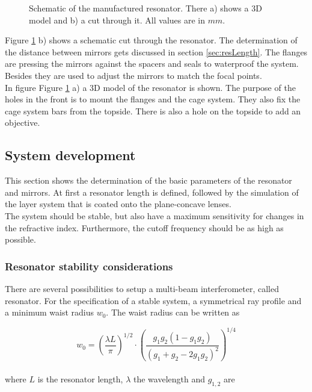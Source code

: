 \begin{figure}[H]
	\caption{Schematic of the manufactured resonator. There a) shows a 3D model and b) a cut through it. All values are in $mm$.}
	\label{fig:resSchematic}
\end{figure}

Figure \ref{fig:resSchematic} b) shows a schematic cut through the resonator. The determination of the distance between mirrors gets discussed in section \ref{sec:resLength}. The flanges are pressing the mirrors against the spacers and seals to waterproof the system. Besides they are used to adjust the mirrors to match the focal points.\\
In figure Figure \ref{fig:resSchematic} a) a 3D model of the resonator is shown. The purpose of the holes in the front is to mount the flanges and the cage system. They also fix the cage system bars from the topside. There is also a hole on the topside to add an objective. \\

\subsection{System development}
\label{sec:sysDev}
This section shows the determination of the basic parameters of the resonator and mirrors. At first a resonator length is defined, followed by the simulation of the layer system that is coated onto the plane-concave lenses.\\
The system should be stable, but also have a maximum sensitivity for changes in the refractive index. Furthermore, the cutoff frequency should be as high as possible. 

\subsubsection{Resonator stability considerations}

There are several possibilities to setup a multi-beam interferometer, called resonator. For the specification of a stable system, a symmetrical ray profile and a minimum waist radius $w_0$. The waist radius can be written as

\begin{equation}
 w_0 = \left(\frac{\lambda L}{\pi}\right)^{1/2} \cdot \left(\frac{g_1 g_2(1-g_1g_2)}{(g_1 + g_2 - 2g_1g_2)^2}\right)^{1/4}
 \label{eq:w_0Res}
\end{equation}
\\
where $L$ is the resonator length, $\lambda$ the wavelength and $g_{1,2}$ are 

